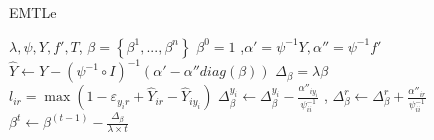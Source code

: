 \begin{algorithm}\label{alg:1}
       \caption{EMTLe}\label{alg:1}
        \begin{algorithmic}[1]
            \REQUIRE $\lambda, \psi,Y,f',T$,
            \ENSURE $\beta=\left\{\beta^1,...,\beta^n\right\}$
            \STATE $\beta^0 = 1$
            ,$\alpha' = \psi^{-1}Y,\alpha'' = \psi^{-1}f'$
                \STATE $\hat Y \leftarrow Y - {\left( {\psi^{-1} \circ I} \right)^{ - 1}}\left( \alpha' - \alpha''diag(\beta) \right)$
                	\STATE ${\Delta _\beta }=\lambda\beta$ 
	                    \STATE $l_{ir} = \max(1 - {\varepsilon _{{y_i}r}} + {\hat Y_{ir}} - {\hat Y_{i{y_i}}})$
	                            \STATE $\Delta _\beta^{{y_i}} \leftarrow \Delta _\beta^{{y_i}} - \frac{{{\alpha''_{i{y_i}}}}}{{{\psi^{-1}_{ii}}}}$%
	                            , $\Delta _\beta^{{r}} \leftarrow \Delta _\beta^{{r}} + \frac{{{\alpha''_{i{r}}}}}{{{\psi^{-1}_{ii}}}}$%
	                    \ENDIF
                \ENDFOR %
                \STATE $\beta^t  \leftarrow \beta^{(t-1)}  - \frac{{{\Delta _\beta }}}{{\lambda\times {t} }}$
             \ENDFOR %
        \end{algorithmic}
\end{algorithm}